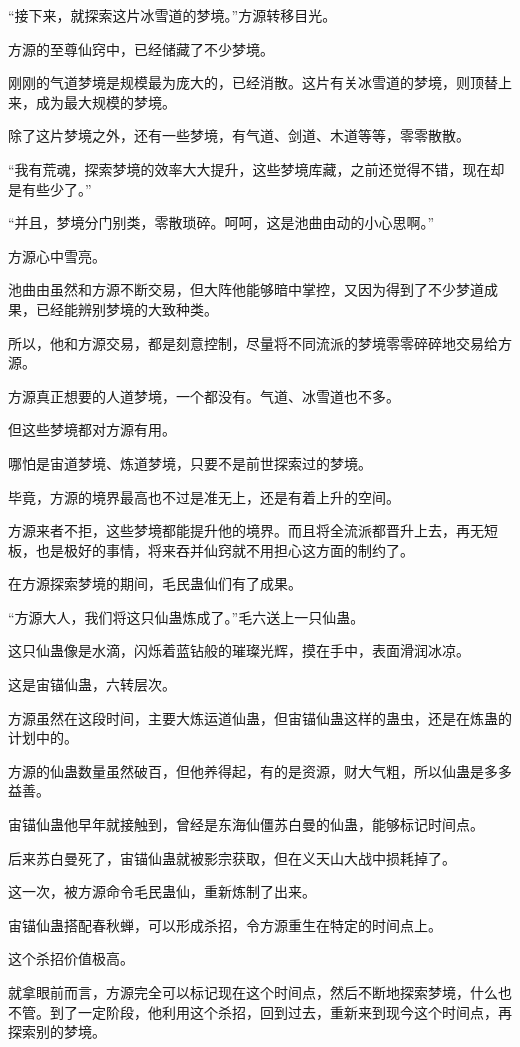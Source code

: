 \begin{this_body}
“接下来，就探索这片冰雪道的梦境。”方源转移目光。

方源的至尊仙窍中，已经储藏了不少梦境。

刚刚的气道梦境是规模最为庞大的，已经消散。这片有关冰雪道的梦境，则顶替上来，成为最大规模的梦境。

除了这片梦境之外，还有一些梦境，有气道、剑道、木道等等，零零散散。

“我有荒魂，探索梦境的效率大大提升，这些梦境库藏，之前还觉得不错，现在却是有些少了。”

“并且，梦境分门别类，零散琐碎。呵呵，这是池曲由动的小心思啊。”

方源心中雪亮。

池曲由虽然和方源不断交易，但大阵他能够暗中掌控，又因为得到了不少梦道成果，已经能辨别梦境的大致种类。

所以，他和方源交易，都是刻意控制，尽量将不同流派的梦境零零碎碎地交易给方源。

方源真正想要的人道梦境，一个都没有。气道、冰雪道也不多。

但这些梦境都对方源有用。

哪怕是宙道梦境、炼道梦境，只要不是前世探索过的梦境。

毕竟，方源的境界最高也不过是准无上，还是有着上升的空间。

方源来者不拒，这些梦境都能提升他的境界。而且将全流派都晋升上去，再无短板，也是极好的事情，将来吞并仙窍就不用担心这方面的制约了。

在方源探索梦境的期间，毛民蛊仙们有了成果。

“方源大人，我们将这只仙蛊炼成了。”毛六送上一只仙蛊。

这只仙蛊像是水滴，闪烁着蓝钻般的璀璨光辉，摸在手中，表面滑润冰凉。

这是宙锚仙蛊，六转层次。

方源虽然在这段时间，主要大炼运道仙蛊，但宙锚仙蛊这样的蛊虫，还是在炼蛊的计划中的。

方源的仙蛊数量虽然破百，但他养得起，有的是资源，财大气粗，所以仙蛊是多多益善。

宙锚仙蛊他早年就接触到，曾经是东海仙僵苏白曼的仙蛊，能够标记时间点。

后来苏白曼死了，宙锚仙蛊就被影宗获取，但在义天山大战中损耗掉了。

这一次，被方源命令毛民蛊仙，重新炼制了出来。

宙锚仙蛊搭配春秋蝉，可以形成杀招，令方源重生在特定的时间点上。

这个杀招价值极高。

就拿眼前而言，方源完全可以标记现在这个时间点，然后不断地探索梦境，什么也不管。到了一定阶段，他利用这个杀招，回到过去，重新来到现今这个时间点，再探索别的梦境。


\end{this_body}
